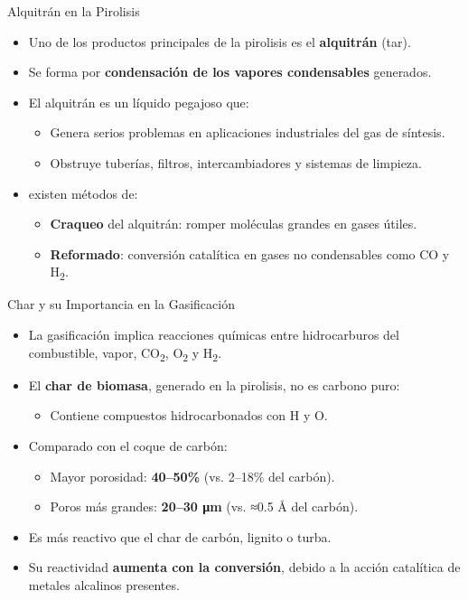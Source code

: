 \documentclass[../../main.tex]{subfiles}
\begin{document}
\begin{frame}{Alquitrán en la Pirolisis}
\small
\begin{itemize}
  \item Uno de los productos principales de la pirolisis es el \textbf{alquitrán} (tar).
  \item Se forma por \textbf{condensación de los vapores condensables} generados.
  \item El alquitrán es un líquido pegajoso que:
  \begin{itemize}
    \item Genera serios problemas en aplicaciones industriales del gas de síntesis.
    \item Obstruye tuberías, filtros, intercambiadores y sistemas de limpieza.
  \end{itemize}
  \item existen métodos de:
  \begin{itemize}
    \item \textbf{Craqueo} del alquitrán: romper moléculas grandes en gases útiles.
    \item \textbf{Reformado}: conversión catalítica en gases no condensables como CO y H\textsubscript{2}.
  \end{itemize}
\end{itemize}
\end{frame}

\begin{frame}{Char y su Importancia en la Gasificación}
\small
\begin{itemize}
  \item La gasificación implica reacciones químicas entre hidrocarburos del combustible, vapor, CO\textsubscript{2}, O\textsubscript{2} y H\textsubscript{2}.
  \item El \textbf{char de biomasa}, generado en la pirolisis, no es carbono puro:
  \begin{itemize}
    \item Contiene compuestos hidrocarbonados con H y O.
  \end{itemize}
  \item Comparado con el coque de carbón:
  \begin{itemize}
    \item Mayor porosidad: \textbf{40–50\%} (vs. 2–18\% del carbón).
    \item Poros más grandes: \textbf{20–30 μm} (vs. ≈0.5 Å del carbón).
  \end{itemize}
  \item Es más reactivo que el char de carbón, lignito o turba.
  \item Su reactividad \textbf{aumenta con la conversión}, debido a la acción catalítica de metales alcalinos presentes.
\end{itemize}
\end{frame}
\end{document}
